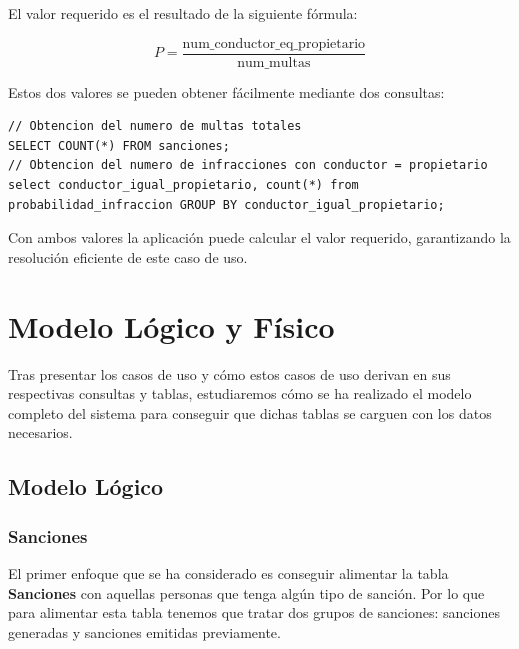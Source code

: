 \documentclass[]{article}
\begin{document}
\begin{itemize}
    El valor requerido es el resultado de la siguiente fórmula: 

    $$P = \frac{\text{num\_conductor\_eq\_propietario}}{\text{num\_multas}}$$

    Estos dos valores se pueden obtener fácilmente mediante dos consultas:

    \begin{lstlisting}[language=cql, caption=Querys para el caso de uso 3]
// Obtencion del numero de multas totales
SELECT COUNT(*) FROM sanciones;
// Obtencion del numero de infracciones con conductor = propietario
select conductor_igual_propietario, count(*) from probabilidad_infraccion GROUP BY conductor_igual_propietario;
    \end{lstlisting}
\end{itemize}

    Con ambos valores la aplicación puede calcular el valor requerido, garantizando la resolución eficiente de este caso de uso.

\section{Modelo Lógico y Físico}
\label{sec:modelo_logico_fisico}

Tras presentar los casos de uso y cómo estos casos de uso derivan en sus
respectivas consultas y tablas, estudiaremos cómo se ha realizado el modelo
completo del sistema para conseguir que dichas tablas se carguen con
los datos necesarios.

\subsection{Modelo Lógico}

\subsubsection{Sanciones}

El primer enfoque que se ha considerado es conseguir alimentar la tabla
\textbf{Sanciones} con aquellas personas que tenga algún tipo de sanción. Por
lo que para alimentar esta tabla tenemos que tratar dos grupos de sanciones:
sanciones generadas y sanciones emitidas previamente.
\end{document}
